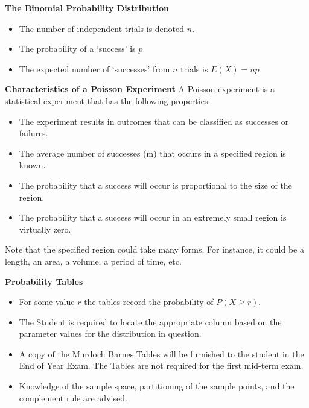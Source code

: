 
{
\textbf{The Binomial Probability Distribution}
\begin{itemize}
\item  The number of independent trials is denoted $n$.
\item  The probability of a `success' is $p$
\item  The expected number of `successes' from $n$ trials is $E(X) = np$
\end{itemize}
}
{
\textbf{Characteristics of a Poisson Experiment}
A Poisson experiment is a statistical experiment that has the following properties:
\begin{itemize}
\item  The experiment results in outcomes that can be classified as successes or failures.
\item  The average number of successes (m) that occurs in a specified region is known.
\item  The probability that a success will occur is proportional to the size of the region.
\item  The probability that a success will occur in an extremely small region is virtually zero.
\end{itemize}
Note that the specified region could take many forms. For instance, it could be a length, an area, a volume, a period of time, etc.
}

{
\textbf{Probability Tables}
\begin{itemize}
\item  For some value $r$ the tables record the probability of $P(X \geq r)$.
\item  The Student is required to locate the appropriate column based on the parameter values for the distribution in question.
\item  A copy of the Murdoch Barnes Tables will be furnished to the student in the End of Year Exam. The Tables are not required for the first mid-term exam.
\item  Knowledge of the sample space, partitioning of the sample points, and the complement rule are advised.
\end{itemize}
}


